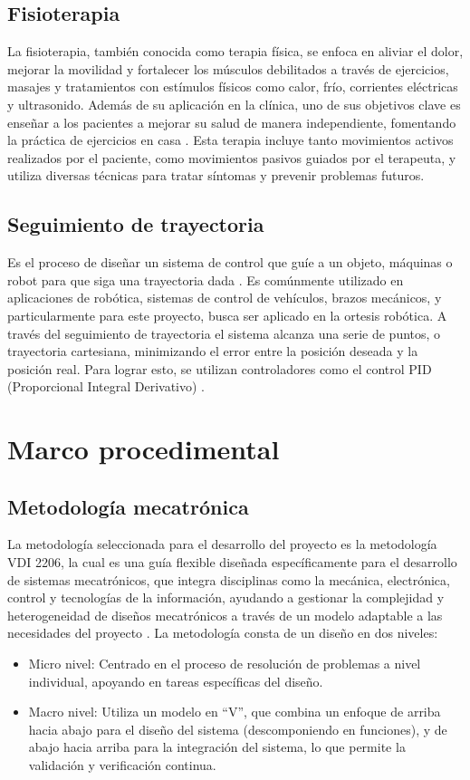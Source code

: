 \subsection{Fisioterapia}
La fisioterapia, también conocida como terapia física, se enfoca en aliviar el dolor, mejorar la movilidad y fortalecer los músculos debilitados a través de ejercicios, masajes y tratamientos con estímulos físicos como calor, frío, corrientes eléctricas y ultrasonido. Además de su aplicación en la clínica, uno de sus objetivos clave es enseñar a los pacientes a mejorar su salud de manera independiente, fomentando la práctica de ejercicios en casa \cite{24}. Esta terapia incluye tanto movimientos activos realizados por el paciente, como movimientos pasivos guiados por el terapeuta, y utiliza diversas técnicas para tratar síntomas y prevenir problemas futuros.
\subsection{Seguimiento de trayectoria}
Es el proceso de diseñar un sistema de control que guíe a un objeto, máquinas o robot para que siga una trayectoria dada \cite{25}. Es comúnmente utilizado en aplicaciones de robótica, sistemas de control de vehículos, brazos mecánicos, y particularmente para este proyecto, busca ser aplicado en la ortesis robótica. A través del seguimiento de trayectoria el sistema alcanza una serie de puntos, o trayectoria cartesiana, minimizando el error entre la posición deseada y la posición real. Para lograr esto, se utilizan controladores como el control PID (Proporcional Integral Derivativo) \cite{26}. 

\section{Marco procedimental}
\subsection{Metodología mecatrónica}
La metodología seleccionada para el desarrollo del proyecto es la metodología VDI 2206, la cual es una guía flexible diseñada específicamente para el desarrollo de sistemas mecatrónicos, que integra disciplinas como la mecánica, electrónica, control y tecnologías de la información, ayudando a gestionar la complejidad y heterogeneidad de diseños mecatrónicos a través de un modelo adaptable a las necesidades del proyecto \cite{30}. 
La metodología consta de un diseño en dos niveles:
\begin{itemize}
	\item Micro nivel: Centrado en el proceso de resolución de problemas a nivel individual, apoyando en tareas específicas del diseño.
	\item Macro nivel: Utiliza un modelo en “V”, que combina un enfoque de arriba hacia abajo para el diseño del sistema (descomponiendo en funciones), y de abajo hacia arriba para la integración del sistema, lo que permite la validación y verificación continua.
\end{itemize}


